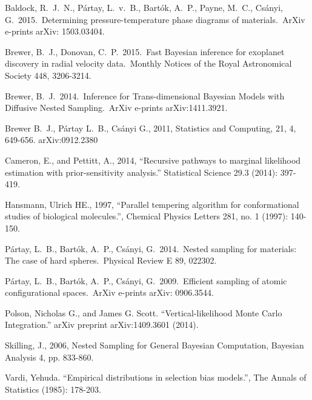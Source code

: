 \documentclass[journal,article,accept,moreauthors,pdftex,12pt,a4paper]{mdpi}
\begin{document}
\begin{thebibliography}{999} %

 Baldock, R.~J.~N., 
P{\'a}rtay, L.~v.~B., Bart{\'o}k, A.~P., Payne, M.~C., Cs{\'a}nyi, G.\ 
2015.\ Determining pressure-temperature phase diagrams of materials.\ ArXiv 
e-prints arXiv: 1503.03404. 

 Brewer, B.~J., 
Donovan, C.~P.\ 2015.\ Fast Bayesian inference for exoplanet discovery in 
radial velocity data.\ Monthly Notices of the Royal Astronomical Society 
448, 3206-3214. 

 Brewer, B.~J.\ 2014.\ Inference 
for Trans-dimensional Bayesian Models with Diffusive Nested Sampling.\ 
ArXiv e-prints arXiv:1411.3921.

 Brewer B.~J., P{\'a}rtay L.~B., Cs{\'a}nyi G., 2011,
Statistics and Computing, 21, 4, 649-656. arXiv:0912.2380

 Cameron, E., and Pettitt, A., 2014,
``Recursive pathways to marginal likelihood estimation with
prior-sensitivity analysis.'' Statistical Science 29.3 (2014): 397-419.

\bibitem[Hansmann(1997)]{pt} Hansmann, Ulrich HE., 1997, ``Parallel tempering algorithm for conformational studies of biological molecules.'', Chemical Physics Letters 281, no. 1 (1997): 140-150.

\bibitem[P{\'a}rtay et al.(2014)]{2014PhRvE..89b2302P} P{\'a}rtay, L.~B., 
Bart{\'o}k, A.~P., Cs{\'a}nyi, G.\ 2014.\ Nested sampling for materials: 
The case of hard spheres.\ Physical Review E 89, 022302. 

 P{\'a}rtay, L.~B., 
Bart{\'o}k, A.~P., Cs{\'a}nyi, G.\ 2009.\ Efficient sampling of atomic 
configurational spaces.\ ArXiv e-prints arXiv: 0906.3544. 

Polson, Nicholas G., and James G. Scott. ``Vertical-likelihood Monte Carlo
Integration.'' arXiv preprint arXiv:1409.3601 (2014).

 Skilling, J., 2006, Nested Sampling for General Bayesian Computation, Bayesian Analysis 4, pp. 833-860.

\bibitem[Vardi (1985)]{vardi}
Vardi, Yehuda. ``Empirical distributions in selection bias models.'', The Annals of Statistics (1985): 178-203.


\end{thebibliography}
\end{document}
